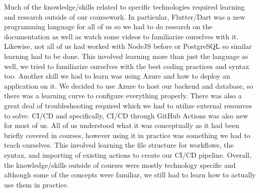 \documentclass{article}
\begin{document}
Much of the knowledge/skills related to specific technologies required learning and research outside of our coursework.
In particular, Flutter/Dart was a new programming language for all of us so we had to do research on the documentation as well
as watch some videos to familiarize ourselves with it. Likewise, not all of us had worked with NodeJS before or PostgreSQL
so similar learning had to be done. This involved learning more than just the language as well, we tried to familiarize ourselves
with the best coding practices and syntax too. Another skill we had to learn was using Azure and how to deploy an application on it.
We decided to use Azure to host our backend and database, so there was a learning curve to configure everything properly. There was
also a great deal of troubleshooting required which we had to utilize external resources to solve. CI/CD and specifically,
CI/CD through GitHub Actions was also new for most of us. All of us understood what it was conceptually as it had been briefly
covered in courses, however using it in practice was something we had to teach ourselves. This involved learning the
file structure for workflows, the syntax, and importing of existing actions to create our CI/CD pipeline. Overall, the knowledge/skills
outside of courses were mostly technology specific and although some of the concepts were familiar, we still had to learn how
to actually use them in practice.
\end{document}
